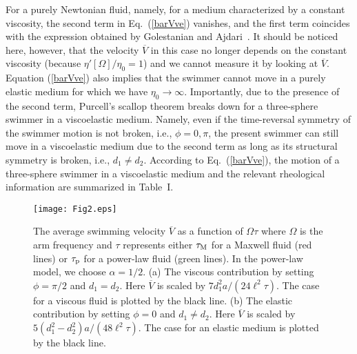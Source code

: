 \documentclass[nofootinbib,twocolumn,showpacs,preprintnumbers,pre,aps]{revtex4-1}
\begin{document}
For a purely Newtonian fluid, namely, for a medium characterized by a constant viscosity, 
the second term in Eq.~(\ref{barVve}) vanishes, and the first term coincides with the
expression obtained by Golestanian and Ajdari~\cite{Golestanian08}.
It should be noticed here, however, that the velocity $\overline{V}$ in this case no 
longer depends on the constant viscosity (because $\eta'[\Omega]/\eta_0=1$) and 
we cannot measure it by looking at $\overline{V}$.
Equation (\ref{barVve}) also implies that the swimmer cannot move in a purely elastic medium 
for which we have $\eta_0 \rightarrow \infty$.
Importantly, due to the presence of the second term, Purcell's scallop theorem breaks down for a 
three-sphere swimmer 
in a viscoelastic medium. 
Namely, even if the time-reversal symmetry of the swimmer motion is not broken, i.e., 
$\phi= 0,\pi$, the present swimmer can still move in a viscoelastic medium due to 
the second term as long as its structural symmetry is broken, i.e., $d_1\ne d_2$. 
According to Eq.~(\ref{barVve}), the motion of a three-sphere swimmer in a viscoelastic medium 
and the relevant rheological information are summarized in Table~I.


\begin{figure}[tbh]
\begin{center}
\texttt{[image: Fig2.eps]}
\end{center}
\caption{
The average swimming velocity $\overline{V}$ as a function of $\Omega \tau$ 
where $\Omega$ is the arm frequency and $\tau$ represents 
either $\tau_{\rm M}$ for a Maxwell fluid (red lines) 
or $\tau_{\rm p}$ for a power-law fluid (green lines).
In the power-law model, we choose $\alpha=1/2$. 
(a) The viscous contribution by setting $\phi=\pi/2$ and $d_1=d_2$. 
Here $\overline{V}$ is scaled by $7d_1^2a/(24\ell^2\tau)$.
The case for a viscous fluid is plotted by the black line.
(b) The elastic contribution by setting $\phi=0$ and $d_1\ne d_2$.
Here $\overline{V}$ is scaled by $5(d_1^2-d_2^2)a/(48\ell^2\tau)$.
The case for an elastic medium is plotted by the black line.
}
\label{plotV}
\end{figure}
\end{document}
